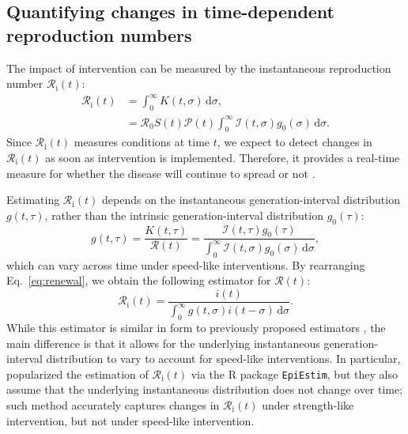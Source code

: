 \documentclass[12pt]{article}
\newcommand{\eref}[1]{Eq.~\ref{eq:#1}}
\newcommand{\Rx}[1]{\ensuremath{{\mathcal R}_{#1}}\xspace}
\newcommand{\Ri}{\Rx{\mathrm{i}}}
\newcommand{\RR}{\ensuremath{{\mathcal R}}\xspace}
\newcommand{\dd}[1]{\ensuremath{\, \mathrm{d}#1}}
\newcommand{\dsigma}{\dd{\sigma}}
\newcommand{\PP}{{\mathcal P}}
\newcommand{\II}{{\mathcal I}}
\begin{document}
\subsection{Quantifying changes in time-dependent reproduction numbers}

The impact of intervention can be measured by the instantaneous reproduction number $\Ri(t)$:
\begin{align}
\Ri(t) &= \int_0^\infty K(t, \sigma) \dsigma, \\
&= \RR_0 S(t) \PP(t) \int_0^\infty \II(t,\sigma) g_0(\sigma) \dsigma.
\label{eq:rt}
\end{align}
Since $\Ri(t)$ measures conditions at time $t$, we expect to detect changes in $\Ri(t)$ as soon as intervention is implemented.
Therefore, it provides a real-time measure for whether the disease will continue to spread or not \citep{gostic2020practical}.

Estimating $\Ri(t)$ depends on the instantaneous generation-interval distribution $g(t, \tau)$, rather than the intrinsic generation-interval distribution $g_0(\tau)$:
\begin{equation}
g(t, \tau) = \frac{K(t, \tau)}{\RR(t)} = \frac{\II(t,\tau) g_0(\tau)}{\int_0^\infty \II(t,\sigma) g_0(\sigma) \dsigma},
\end{equation}
which can vary across time under speed-like interventions.
By rearranging \eref{renewal}, we obtain the following estimator for $\RR(t)$:
\begin{equation}
\Ri(t) = \frac{i(t)}{\int_0^\infty g(t, \sigma) i(t-\sigma) \dsigma}.
\end{equation}
While this estimator is similar in form to previously proposed estimators \citep{fraser2007estimating}, the main difference is that it allows for the underlying instantaneous generation-interval distribution to vary to account for speed-like interventions.
In particular, \cite{cori2013new} popularized the estimation of $\Ri(t)$ via the R package \texttt{EpiEstim}, but they also assume that the underlying instantaneous distribution does not change over time; 
such method accurately captures changes in $\Ri(t)$ under strength-like intervention, but not under speed-like intervention.
\end{document}
